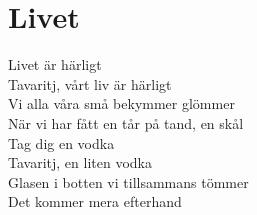 \section{Livet}
Livet är härligt\\
Tavaritj, vårt liv är härligt\\
Vi alla våra små bekymmer glömmer\\
När vi har fått en tår på tand, en skål\\
Tag dig en vodka\\
Tavaritj, en liten vodka\\
Glasen i botten vi tillsammans tömmer\\
Det kommer mera efterhand
